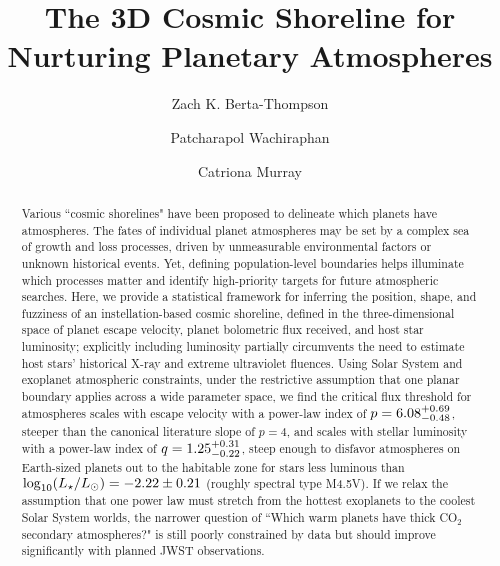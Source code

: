 \documentclass[modern,linenumbers,trackchanges]{aastex7}
\begin{document}
\title{The 3D Cosmic Shoreline for Nurturing Planetary Atmospheres}



\author[orcid=0000-0002-3321-4924,sname='Berta-Thompson']{Zach K. Berta-Thompson}


\author[orcid=0000-0001-6484-7559,sname='Wachiraphan']{Patcharapol Wachiraphan}



\author[orcid=0000-0001-8504-5862,sname='Murray']{Catriona Murray}







\begin{abstract}

Various ``cosmic shorelines" have been proposed to delineate which planets have atmospheres. The fates of individual planet atmospheres may be set by a complex sea of growth and loss processes, driven by unmeasurable environmental factors or unknown historical events. Yet, defining population-level boundaries helps illuminate which processes matter and identify high-priority targets for future atmospheric searches. Here, we provide a statistical framework for inferring the position, shape, and fuzziness of an instellation-based cosmic shoreline, defined in the three-dimensional space of planet escape velocity, planet bolometric flux received, and host star luminosity; explicitly including luminosity partially circumvents the need to estimate host stars' historical X-ray and extreme ultraviolet fluences. Using Solar System and exoplanet atmospheric constraints, under the restrictive assumption that one planar boundary applies across a wide parameter space, we find the critical flux threshold for atmospheres scales with escape velocity with a power-law index of $p=6.08_{-0.48}^{+0.69}$, steeper than the canonical literature slope of $p=4$, and scales with stellar luminosity with a power-law index of $q=1.25_{-0.22}^{+0.31}$, steep enough to disfavor atmospheres on Earth-sized planets out to the habitable zone for stars less luminous than $\log_{10} (L_\star/L_\odot) = -2.22 \pm 0.21$ (roughly spectral type M4.5V). If we relax the assumption that one power law must stretch from the hottest exoplanets to the coolest Solar System worlds, the narrower question of ``Which warm planets have thick CO$_2$ secondary atmospheres?" is still poorly constrained by data but should improve significantly with planned JWST observations. 

\end{abstract}
\end{document}
